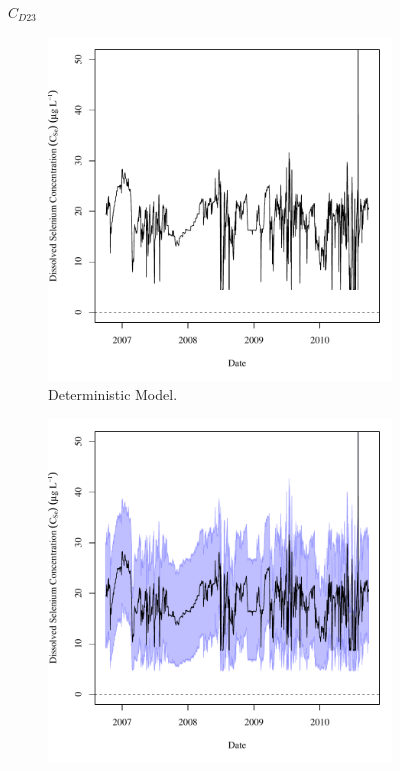 \begin{linenumbers}
\subfiguremid
\begin{landscape}
	\begin{figure}
		$ C_{D23} $
		\begin{subfigure}{0.7\textwidth}
			\centering
			\includegraphics[width=\tableCustomSize]{"Figures/Results_DSR/Deterministic/c TS BIG"}
			\caption{Deterministic Model.}
		\end{subfigure}%
		\begin{subfigure}{0.7\textwidth}
			\centering
			\includegraphics[width=\tableCustomSize]{"Figures/Results_DSR/Stochastic/c TS BIG"}

\end{subfigure}
\end{figure}
\end{landscape}
\end{linenumbers}
